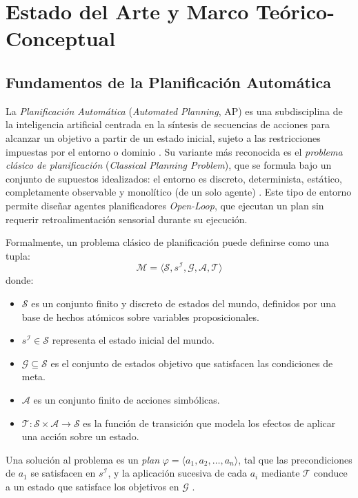 \chapter{Estado del Arte y Marco Teórico-Conceptual}\label{chapter:state-of-the-art}

\section{Fundamentos de la Planificación Automática}

La \textit{Planificación Automática} (\textit{Automated Planning}, AP) es una subdisciplina de la inteligencia artificial centrada en la síntesis de secuencias de acciones para alcanzar un objetivo a partir de un estado inicial, sujeto a las restricciones impuestas por el entorno o dominio \parencite{tantakoun2025llms}. Su variante más reconocida es el \textit{problema clásico de planificación} (\textit{Classical Planning Problem}), que se formula bajo un conjunto de supuestos idealizados: el entorno es discreto, determinista, estático, completamente observable y monolítico (de un solo agente) \parencite{peter2021modern}. Este tipo de entorno permite diseñar agentes planificadores \textit{Open-Loop}, que ejecutan un plan sin requerir retroalimentación sensorial durante su ejecución.

Formalmente, un problema clásico de planificación puede definirse como una tupla:
\[
\mathcal{M} = \langle \mathcal{S}, s^{\mathcal{I}}, \mathcal{G}, \mathcal{A}, \mathcal{T} \rangle
\]
donde:
\begin{itemize}
    \item $\mathcal{S}$ es un conjunto finito y discreto de estados del mundo, definidos por una base de hechos atómicos sobre variables proposicionales.
    \item $s^{\mathcal{I}} \in \mathcal{S}$ representa el estado inicial del mundo.
    \item $\mathcal{G} \subseteq \mathcal{S}$ es el conjunto de estados objetivo que satisfacen las condiciones de meta.
    \item $\mathcal{A}$ es un conjunto finito de acciones simbólicas.
    \item $\mathcal{T}: \mathcal{S} \times \mathcal{A} \rightarrow \mathcal{S}$ es la función de transición que modela los efectos de aplicar una acción sobre un estado.
\end{itemize}

Una solución al problema es un \textit{plan} $\varphi = \langle a_1, a_2, \dots, a_n \rangle$, tal que las precondiciones de $a_1$ se satisfacen en $s^{\mathcal{I}}$, y la aplicación sucesiva de cada $a_i$ mediante $\mathcal{T}$ conduce a un estado que satisface los objetivos en $\mathcal{G}$ \parencite{tantakoun2025llms}.

